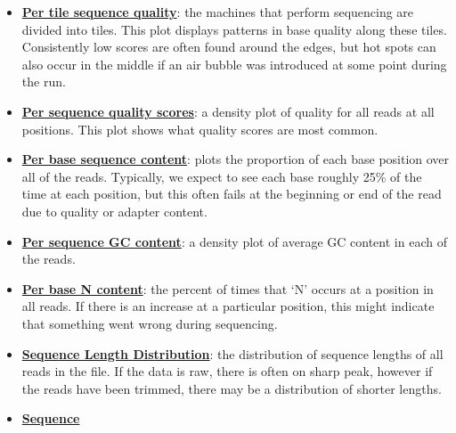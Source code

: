 \documentclass[
  letterpaper,
  DIV=11,
  numbers=noendperiod]{scrreprt}
\begin{document}
\begin{itemize}
\item
  \href{https://www.bioinformatics.babraham.ac.uk/projects/fastqc/Help/3\%20Analysis\%20Modules/12\%20Per\%20Tile\%20Sequence\%20Quality.html}{\textbf{Per
  tile sequence quality}}: the machines that perform sequencing are
  divided into tiles. This plot displays patterns in base quality along
  these tiles. Consistently low scores are often found around the edges,
  but hot spots can also occur in the middle if an air bubble was
  introduced at some point during the run.
\item
  \href{https://www.bioinformatics.babraham.ac.uk/projects/fastqc/Help/3\%20Analysis\%20Modules/3\%20Per\%20Sequence\%20Quality\%20Scores.html}{\textbf{Per
  sequence quality scores}}: a density plot of quality for all reads at
  all positions. This plot shows what quality scores are most common.
\item
  \href{https://www.bioinformatics.babraham.ac.uk/projects/fastqc/Help/3\%20Analysis\%20Modules/4\%20Per\%20Base\%20Sequence\%20Content.html}{\textbf{Per
  base sequence content}}: plots the proportion of each base position
  over all of the reads. Typically, we expect to see each base roughly
  25\% of the time at each position, but this often fails at the
  beginning or end of the read due to quality or adapter content.
\item
  \href{https://www.bioinformatics.babraham.ac.uk/projects/fastqc/Help/3\%20Analysis\%20Modules/5\%20Per\%20Sequence\%20GC\%20Content.html}{\textbf{Per
  sequence GC content}}: a density plot of average GC content in each of
  the reads.
\item
  \href{https://www.bioinformatics.babraham.ac.uk/projects/fastqc/Help/3\%20Analysis\%20Modules/6\%20Per\%20Base\%20N\%20Content.html}{\textbf{Per
  base N content}}: the percent of times that `N' occurs at a position
  in all reads. If there is an increase at a particular position, this
  might indicate that something went wrong during sequencing.
\item
  \href{https://www.bioinformatics.babraham.ac.uk/projects/fastqc/Help/3\%20Analysis\%20Modules/7\%20Sequence\%20Length\%20Distribution.html}{\textbf{Sequence
  Length Distribution}}: the distribution of sequence lengths of all
  reads in the file. If the data is raw, there is often on sharp peak,
  however if the reads have been trimmed, there may be a distribution of
  shorter lengths.
\item
  \href{https://www.bioinformatics.babraham.ac.uk/projects/fastqc/Help/3\%20Analysis\%20Modules/8\%20Duplicate\%20Sequences.html}{\textbf{Sequence
}}
\end{itemize}
\end{document}
